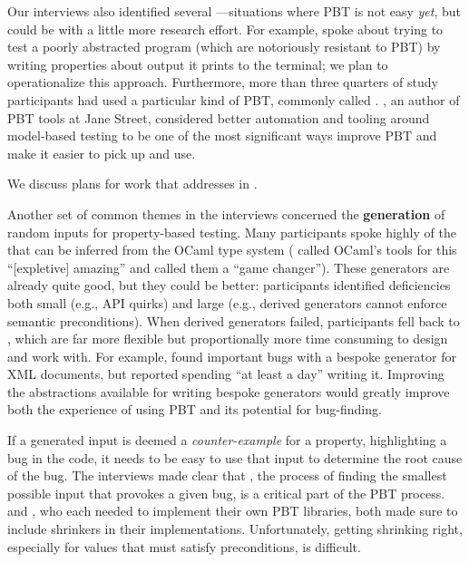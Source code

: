 Our interviews also identified several ---situations where PBT is not easy {\em yet}, but could be with a
little more research effort. For example,  spoke about trying to
test a poorly abstracted program (which are notoriously resistant to PBT) by
writing properties about output it prints to the terminal; we plan to
operationalize this approach.
Furthermore, more than three quarters of study participants had used a
particular kind of PBT, commonly called
.
, an author of PBT tools at Jane Street, considered better
automation and tooling around model-based testing to be one of the most
significant ways improve PBT and make it easier to pick up and use.

We discuss plans for work that addresses  in .  

\smallskip

Another set of common themes in the interviews concerned the {\bf generation} of
random inputs for property-based testing. Many participants spoke
highly of the  that can be inferred from
the OCaml type system ( called OCaml's tools for this
``[expletive] amazing'' and  called them a ``game changer'').
These generators are already quite good, but they could be better: participants
identified deficiencies both small (e.g., API quirks) and large (e.g.,
derived generators
cannot enforce semantic preconditions). When derived generators
failed, participants fell back to , which
are far more flexible but proportionally more time consuming to design and work
with. For example,  found important bugs with a bespoke
generator for XML documents,
but reported spending ``at least a day'' writing it.
Improving the abstractions available for writing bespoke generators would
greatly improve both the experience of using PBT and its potential for
bug-finding.

If a generated input is deemed a {\em counter-example} for a property,
highlighting a bug in the code, it needs to be easy to use that input to
determine the root cause of the bug. The interviews made clear that
, the process of finding the smallest possible input that
provokes a given bug, is a critical part of the PBT process.  
and , who each needed to implement their own PBT libraries, both
made sure to include shrinkers in their implementations. Unfortunately, getting
shrinking right, especially for values that must satisfy preconditions, is
difficult.

